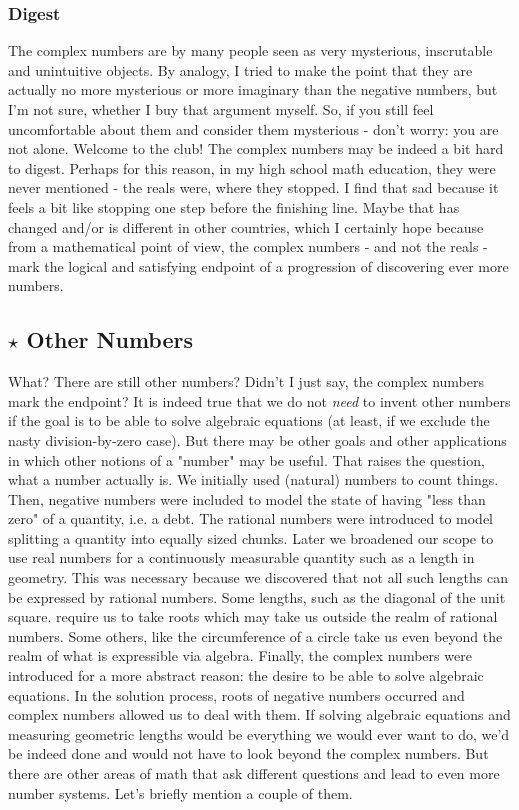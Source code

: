 \subsubsection{Digest}
The complex numbers are by many people seen as very mysterious, inscrutable and unintuitive objects. By analogy, I tried to make the point that they are actually no more mysterious or more imaginary than the negative numbers, but I'm not sure, whether I buy that argument myself. So, if you still feel uncomfortable about them and consider them mysterious - don't worry: you are not alone. Welcome to the club! The complex numbers may be indeed a bit hard to digest. Perhaps for this reason, in my high school math education, they were never mentioned - the reals were, where they stopped. I find that sad because it feels a bit like stopping one step before the finishing line. Maybe that has changed and/or is different in other countries, which I certainly hope because from a mathematical point of view, the complex numbers - and not the reals - mark the logical and satisfying endpoint of a progression of discovering ever more numbers.


\subsection{$\star$ Other Numbers}
What? There are still other numbers? Didn't I just say, the complex numbers mark the endpoint? It is indeed true that we do not \emph{need} to invent other numbers if the goal is to be able to solve algebraic equations (at least, if we exclude the nasty division-by-zero case). But there may be other goals and other applications in which other notions of a "number" may be useful. That raises the question, what a number actually is. We initially used (natural) numbers to count things. Then, negative numbers were included to model the state of having "less than zero" of a quantity, i.e. a debt. The rational numbers were introduced to model splitting a quantity into equally sized chunks. Later we broadened our scope to use real numbers for a continuously measurable quantity such as a length in geometry. This was necessary because we discovered that not all such lengths can be expressed by rational numbers. Some lengths, such as the diagonal of the unit square. require us to take roots which may take us outside the realm of rational numbers. Some others, like the circumference of a circle take us even beyond the realm of what is expressible via algebra. Finally, the complex numbers were introduced for a more abstract reason: the desire to be able to solve algebraic equations. In the solution process, roots of negative numbers occurred and complex numbers allowed us to deal with them. If solving algebraic equations and measuring geometric lengths would be everything we would ever want to do, we'd be indeed done and would not have to look beyond the complex numbers. But there are other areas of math that ask different questions and lead to even more number systems. Let's briefly mention a couple of them.

